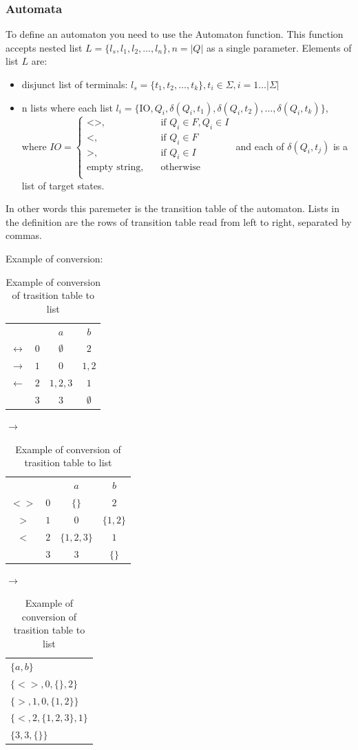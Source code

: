 \documentclass{ctuthesis}
\begin{document}
\subsubsection{Automata}
To define an automaton you need to use the Automaton function. This function accepts nested list $L = \{l_s, l_1, l_2, \ldots, l_n\}, n = |Q|$ as a single parameter. Elements of list $L$ are:
\begin{itemize}
	\item disjunct list of terminals: $l_s = \{t_1, t_2, \ldots, t_k\}, t_i \in \Sigma, i = 1\ldots |\Sigma|$
	\item n lists where each list $l_i = \{\text{IO}, Q_i, \delta(Q_i, t_1), \delta(Q_i, t_2), \ldots, \delta(Q_i, t_k)\}$, where $IO = 
		\begin{cases}
			\text{<>,} &\quad\text{if }Q_i \in F, Q_i \in I \\
			\text{<,} &\quad\text{if }Q_i \in F\\
			\text{>,} &\quad\text{if }Q_i \in I \\
			\text{empty string,} &\quad\text{otherwise}\\
		\end{cases}$
		and each of $\delta(Q_i, t_j)$ is a list of target states.
\end{itemize}

In other words this paremeter is the transition table of the automaton. Lists in the definition are the rows of transition table read from left to right, separated by commas.

Example of conversion:
\begin{table}[H]
\begin{ctucolortab}
\begin{tabular}{cc|cc}
	&	& $a$	& $b$ \\\Midrule
$\leftrightarrow$	& $0$	& $\emptyset$	& $2$ \\
$\rightarrow$	& $1$ & $0$ & $1,2$ \\
$\leftarrow$	& $2$ & $1,2,3$ & $1$ \\
				& $3$ & $3$	& $\emptyset$ 
\end{tabular}
\quad
$\rightarrow$
\begin{tabular}{|c|c|c|c|}
\hline
	&&$a$&$b$ \\
	$<>$ & $0$ & $\{\}$ & $2$ \\
	$>$ & $1$ & $0$ & $\{1,2\}$ \\
	$<$ & $2$ & $\{1,2,3\}$ & $1$ \\
		& $3$ & $3$ & $\{\}$\\
		\hline
\end{tabular}
\quad 
$\rightarrow$
\begin{tabular}{|l|}
\hline 
$\{a, b\}$ \\
$\{<>,0,\{\}, 2\}$ \\
$\{>,1,0,\{1,2\}\}$ \\
$\{<,2,\{1,2,3\},1\}$ \\
$\{3, 3, \{\}\}$ \\\hline
\end{tabular}
\end{ctucolortab}
\caption{Example of conversion of trasition table to list}
\label{fig:example_conversion}
\end{table}
\end{document}
